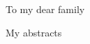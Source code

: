 \documentclass[12pt,a4paper]{Thesis} %
\begin{document}
\begin{center}
\large{To my dear family}
\end{center}
\vfill\vfill\null %
\cleardoublepage %

\pagestyle{fancy} %
\fancyhead{}   %
\fancyhead[LO]{\sl{\leftmark}}
\fancyhead[RE]{\sl{\rightmark}}
\fancyhead[LE,RO]{\thepage}





My abstracts




\pagestyle{fancy} %

\tableofcontents %

\listoffigures %

\listoftables %



%
%
\end{document}
